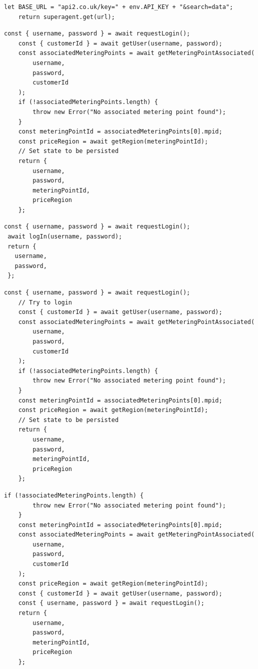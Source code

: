 \documentclass[jou,apacite]{apa6}
\begin{document}
\begin{lstlisting}[caption=Comparison 5b - Similar functions with literal and identifier name changes]
	let BASE_URL = "api2.co.uk/key=" + env.API_KEY + "&search=data";
	return superagent.get(url);
\end{lstlisting}

\begin{lstlisting}[caption=Comparison 6a - Real integration connect bodies]
    const { username, password } = await requestLogin();
    const { customerId } = await getUser(username, password);
    const associatedMeteringPoints = await getMeteringPointAssociated(
        username,
        password,
        customerId
    );
    if (!associatedMeteringPoints.length) {
        throw new Error("No associated metering point found");
    }
    const meteringPointId = associatedMeteringPoints[0].mpid;
    const priceRegion = await getRegion(meteringPointId);
    // Set state to be persisted
    return {
        username,
        password,
        meteringPointId,
        priceRegion
    };
\end{lstlisting}

\begin{lstlisting}[caption=Comparison 6b - Real integration connect bodies]
 const { username, password } = await requestLogin();
 await logIn(username, password);
 return {
   username,
   password,
 };
\end{lstlisting}

\begin{lstlisting}[caption=Comparison 7a - Real integration against order scrambled integration]
	const { username, password } = await requestLogin();
	// Try to login
	const { customerId } = await getUser(username, password);
	const associatedMeteringPoints = await getMeteringPointAssociated(
		username,
		password,
		customerId
	);
	if (!associatedMeteringPoints.length) {
		throw new Error("No associated metering point found");
	}
	const meteringPointId = associatedMeteringPoints[0].mpid;
	const priceRegion = await getRegion(meteringPointId);
	// Set state to be persisted
	return {
		username,
		password,
		meteringPointId,
		priceRegion
	};
\end{lstlisting}

\begin{lstlisting}[caption=Comparison 7b - Real integration against order scrambled integration]
	if (!associatedMeteringPoints.length) {
		throw new Error("No associated metering point found");
	}
	const meteringPointId = associatedMeteringPoints[0].mpid;
	const associatedMeteringPoints = await getMeteringPointAssociated(
		username,
		password,
		customerId
	);
	const priceRegion = await getRegion(meteringPointId);
	const { customerId } = await getUser(username, password);
	const { username, password } = await requestLogin();
	return {
		username,
		password,
		meteringPointId,
		priceRegion
	};
\end{lstlisting}
\end{document}
